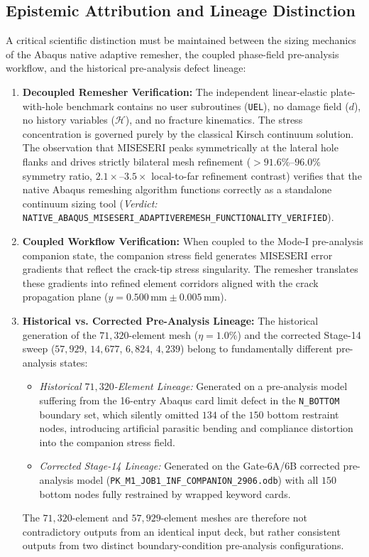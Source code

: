 \subsection{Epistemic Attribution and Lineage Distinction}
\label{subsec:stage14uap_epistemic_attribution}

A critical scientific distinction must be maintained between the sizing mechanics of the Abaqus native adaptive remesher, the coupled phase-field pre-analysis workflow, and the historical pre-analysis defect lineage:
\begin{enumerate}
  \item \textbf{Decoupled Remesher Verification:} The independent linear-elastic plate-with-hole benchmark contains no user subroutines (\texttt{UEL}), no damage field ($d$), no history variables ($\mathcal{H}$), and no fracture kinematics. The stress concentration is governed purely by the classical Kirsch continuum solution. The observation that $\mathrm{MISESERI}$ peaks symmetrically at the lateral hole flanks and drives strictly bilateral mesh refinement ($>91.6\%\text{--}96.0\%$ symmetry ratio, $2.1\times\text{--}3.5\times$ local-to-far refinement contrast) verifies that the native Abaqus remeshing algorithm functions correctly as a standalone continuum sizing tool (\textit{Verdict:} \texttt{NATIVE\_ABAQUS\_MISESERI\_ADAPTIVEREMESH\_FUNCTIONALITY\_VERIFIED}).
  \item \textbf{Coupled Workflow Verification:} When coupled to the Mode-I pre-analysis companion state, the companion stress field generates $\mathrm{MISESERI}$ error gradients that reflect the crack-tip stress singularity. The remesher translates these gradients into refined element corridors aligned with the crack propagation plane ($y = 0.500\,\mathrm{mm} \pm 0.005\,\mathrm{mm}$).
  \item \textbf{Historical vs. Corrected Pre-Analysis Lineage:} The historical generation of the $71{,}320$-element mesh ($\eta = 1.0\%$) and the corrected Stage-14 sweep ($57{,}929$, $14{,}677$, $6{,}824$, $4{,}239$) belong to fundamentally different pre-analysis states:
  \begin{itemize}
    \item \textit{Historical $71{,}320$-Element Lineage:} Generated on a pre-analysis model suffering from the 16-entry Abaqus card limit defect in the \texttt{N\_BOTTOM} boundary set, which silently omitted $134$ of the $150$ bottom restraint nodes, introducing artificial parasitic bending and compliance distortion into the companion stress field.
    \item \textit{Corrected Stage-14 Lineage:} Generated on the Gate-6A/6B corrected pre-analysis model (\texttt{PK\_M1\_JOB1\_INF\_COMPANION\_2906.odb}) with all $150$ bottom nodes fully restrained by wrapped keyword cards.
  \end{itemize}
  The $71{,}320$-element and $57{,}929$-element meshes are therefore not contradictory outputs from an identical input deck, but rather consistent outputs from two distinct boundary-condition pre-analysis configurations.
\end{enumerate}


